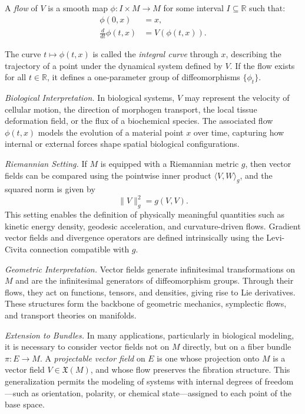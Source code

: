 \begin{definition}
A \emph{flow} of $V$ is a smooth map $\phi : I \times M \to M$ for some interval $I \subseteq \mathbb{R}$ such that:
\begin{align}
\phi(0, x) &= x, \\
\label{eq:flow_ode}
\frac{d}{dt}\phi(t, x) &= V(\phi(t, x)).
\end{align}
\end{definition}

The curve $t \mapsto \phi(t, x)$ is called the \emph{integral curve} through $x$, describing the trajectory of a point under the dynamical system defined by $V$. If the flow exists for all $t \in \mathbb{R}$, it defines a one-parameter group of diffeomorphisms $\{\phi_t\}$.

{\it Biological Interpretation.} In biological systems, $V$ may represent the velocity of cellular motion, the direction of morphogen transport, the local tissue deformation field, or the flux of a biochemical species. The associated flow $\phi(t, x)$ models the evolution of a material point $x$ over time, capturing how internal or external forces shape spatial biological configurations.

{\it Riemannian Setting.} If $M$ is equipped with a Riemannian metric $g$, then vector fields can be compared using the pointwise inner product $\langle V, W \rangle_g$, and the squared norm is given by
\[
\|V\|_g^2 = g(V, V).
\]
This setting enables the definition of physically meaningful quantities such as kinetic energy density, geodesic acceleration, and curvature-driven flows. Gradient vector fields and divergence operators are defined intrinsically using the Levi-Civita connection compatible with $g$.

{\it Geometric Interpretation.} Vector fields generate infinitesimal transformations on $M$ and are the infinitesimal generators of diffeomorphism groups. Through their flows, they act on functions, tensors, and densities, giving rise to Lie derivatives. These structures form the backbone of geometric mechanics, symplectic flows, and transport theories on manifolds.

{\it Extension to Bundles.} In many applications, particularly in biological modeling, it is necessary to consider vector fields not on $M$ directly, but on a fiber bundle $\pi : E \to M$. A \emph{projectable vector field} on $E$ is one whose projection onto $M$ is a vector field $V \in \mathfrak{X}(M)$, and whose flow preserves the fibration structure. This generalization permits the modeling of systems with internal degrees of freedom—such as orientation, polarity, or chemical state—assigned to each point of the base space.

